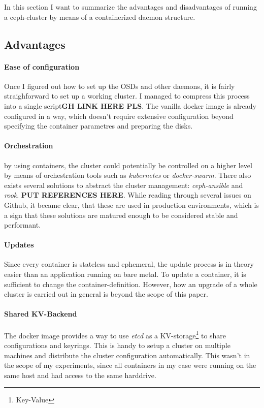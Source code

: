 \documentclass[titlepage, a4paper, 11pt]{scrartcl}
\begin{document}
        In this section I want to summarize the advantages and disadvantages of running a ceph-cluster by means of a containerized daemon structure.

        \subsection{Advantages}

            \paragraph{Ease of configuration} Once I figured out how to set up the OSDs and other daemons, it is fairly straighforward to set up a working cluster. I managed to compress this process into a single script\textbf{GH LINK HERE PLS}. The vanilla docker image is already configured in a way, which doesn't require extensive configuration beyond specifying the container parametres and preparing the disks.

            \paragraph{Orchestration} by using containers, the cluster could potentially be controlled on a higher level by means of orchestration tools such as \textit{kubernetes} or \textit{docker-swarm}. There also exists several solutions to abstract the cluster management: \textit{ceph-ansible} and \textit{rook}. \textbf{PUT REFERENCES HERE}. While reading through several issues on Github, it became clear, that these are used in production environments, which is a sign that these solutions are matured enough to be considered stable and performant.

            \paragraph{Updates} Since every container is stateless and ephemeral, the update process is in theory easier than an application running on bare metal. To update a container, it is sufficient to change the container-definition. However, how an upgrade of a whole cluster is carried out in general is beyond the scope of this paper.

            \paragraph{Shared KV-Backend} The docker image provides a way to use \textit{etcd} as a KV-storage\footnote{Key-Value} to share configurations and keyrings. This is handy to setup a cluster on multiple machines and distribute the cluster configuration automatically. This wasn't in the scope of my experiments, since all containers in my case were running on the same host and had access to the same harddrive.
\end{document}
